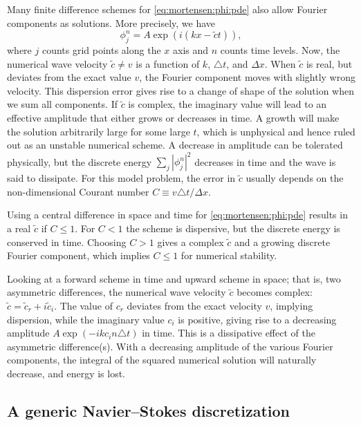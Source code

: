 Many finite difference schemes for \eqref{eq:mortensen:phi:pde} also allow
Fourier components as solutions. More precisely, we have
\begin{equation}
   \phi_j^n = A\exp{(i(kx - \tilde c t))},
\end{equation}
where $j$ counts grid points along the $x$ axis and $n$ counts time
levels.  Now, the numerical wave velocity $\tilde c \neq v$ is a
function of $k$, $\triangle t$, and $\Delta x$.  When $\tilde c$ is
real, but deviates from the exact value $v$, the Fourier component
moves with slightly wrong velocity. This dispersion error gives rise
to a change of shape of the solution when we sum all components.  If
$\tilde c$ is complex, the imaginary value will lead to an effective
amplitude that either grows or decreases in time. A growth will make
the solution arbitrarily large for some large $t$, which is unphysical
and hence ruled out as an unstable numerical scheme.  A decrease in
amplitude can be tolerated physically, but the discrete energy $\sum_j
|\phi_j^n|^2$ decreases in time and the wave is said to dissipate.
For this model problem, the error in $\tilde c$ usually depends on the
non-dimensional Courant number $C\equiv v\triangle t/\Delta x$.

Using a central difference in space and time for
\eqref{eq:mortensen:phi:pde} results in a real $\tilde c$ if $C\leqslant
1$. For $C<1$ the scheme is dispersive, but the discrete energy is
conserved in time.  Choosing $C>1$ gives a complex $\tilde c$ and a
growing discrete Fourier component, which implies $C\leqslant1$ for
numerical stability.

Looking at a forward scheme in time and upward scheme in space; that is,
two asymmetric differences, the numerical wave velocity $\tilde c$
becomes complex: $\tilde c = \tilde c_r + i\tilde c_i$.  The value of
$c_r$ deviates from the exact velocity $v$, implying dispersion, while
the imaginary value $c_i$ is positive, giving rise to a decreasing
amplitude $A\exp{(-ikc_i n\triangle t)}$ in time.  This is a
dissipative effect of the asymmetric difference(s).  With a decreasing
amplitude of the various Fourier components, the integral of the
squared numerical solution will naturally decrease, and energy is
lost.

\subsection{A generic Navier--Stokes discretization}
\label{sec:mortensen:NS-solver}

